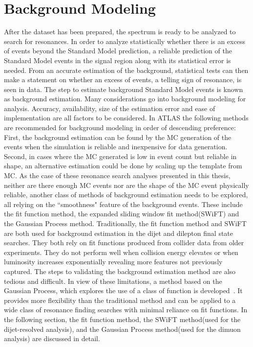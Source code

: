\section{Background Modeling}
\label{sec:backgroundest}
After the dataset has been prepared, the spectrum is ready to be analyzed to search for resonances. In order to analyze statistically whether there is an excess of events beyond the Standard Model prediction, a reliable prediction of the Standard Model events in the signal region along with its statistical error is needed. From an accurate estimation of the background, statistical tests can then make a statement on whether an excess of events, a telling sign of resonance, is seen in data.
The step to estimate background Standard Model events is known as background estimation.
    Many considerations go into background modeling for analysis. Accuracy, availability, size of the estimation error and ease of implementation are all factors to be considered. In ATLAS the following methods are recommended for background modeling in order of descending preference:
    First, the background estimation can be found by the MC generation of the events when the simulation is reliable and inexpensive for data generation. Second, in cases where the MC generated is low in event count but reliable in shape, an alternative estimation could be done by scaling up the template from MC. As the case of these resonance search analyses presented in this thesis, neither are there enough MC events nor are the shape of the MC event physically reliable, another class of methods of background estimation needs to be explored, all relying on the ``smoothness" feature of the background events. These include the fit function method, the expanded sliding window fit method(SWiFT) and the Gaussian Process method.
    Traditionally, the fit function method and SWiFT are both used for background estimation in the dijet and dilepton final state searches. They both rely on fit functions produced from collider data from older experiments. They do not perform well when collision energy elevates or when luminosity increases exponentially revealing more features not previously captured. The steps to validating the background estimation method are also tedious and difficult.
    In view of these limitations, a method based on the Gaussian Process, which explores the use of a class of function is developed~\cite{frate2017modeling}. It provides more flexibility than the traditional method and can be applied to a wide class of resonance finding searches with minimal reliance on fit functions. 
    In the following section, the fit function method, the SWiFT method(used for the dijet-resolved analysis), and the Gaussian Process method(used for the dimuon analysis) are discussed in detail. 

